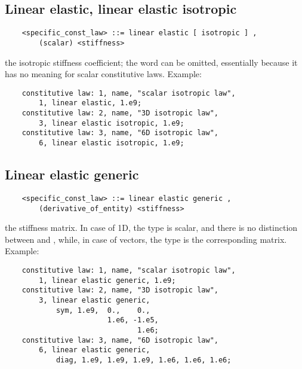 \subsection{Linear elastic, linear elastic isotropic}
\begin{verbatim}
    <specific_const_law> ::= linear elastic [ isotropic ] , 
        (scalar) <stiffness>
\end{verbatim}
the isotropic stiffness coefficient; the word 
can be omitted, essentially because it has no meaning
for scalar constitutive laws.
Example:
\begin{verbatim}
    constitutive law: 1, name, "scalar isotropic law",
        1, linear elastic, 1.e9;
    constitutive law: 2, name, "3D isotropic law",
        3, linear elastic isotropic, 1.e9;
    constitutive law: 3, name, "6D isotropic law",
        6, linear elastic isotropic, 1.e9;
\end{verbatim}
  
  
\subsection{Linear elastic generic}
\begin{verbatim}
    <specific_const_law> ::= linear elastic generic ,  
        (derivative_of_entity) <stiffness>
\end{verbatim}
the stiffness matrix. In case of 1D, the type is scalar, 
and there is no distinction between  and , 
while, in case of  vectors, the type is the corresponding 
 matrix.
Example:
\begin{verbatim}
    constitutive law: 1, name, "scalar isotropic law",
        1, linear elastic generic, 1.e9;
    constitutive law: 2, name, "3D isotropic law",
        3, linear elastic generic,
            sym, 1.e9,  0.,    0.,
                        1.e6, -1.e5,
                               1.e6;
    constitutive law: 3, name, "6D isotropic law",
        6, linear elastic generic,
            diag, 1.e9, 1.e9, 1.e9, 1.e6, 1.e6, 1.e6;
\end{verbatim}
  

